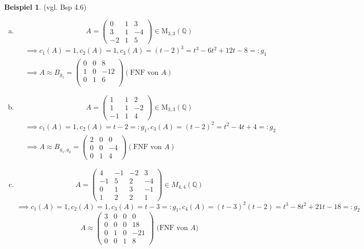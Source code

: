 \documentclass[a4paper, titlepage]{article}
\theoremstyle{definition}
\newtheorem{bsp}[satz]{Beispiel}
\newcommand{\Q}{\mathbb{Q}}
\newcommand{\M}{\mathrm{M}}
\begin{document}
\begin{bsp} (vgl. Bsp 4.6)
    \begin{enumerate}[(a)]
        \item $$A=\begin{pmatrix}
            0 & 1& 3\\
            3 & 1 & -4 \\
            -2 & 1 & 5
        \end{pmatrix}\in \M_{3,3}(\Q)$$
        \begin{align*}
            &\implies c_1(A)=1,c_2(A)=1,c_3(A)=(t-2)^3=t^3-6t^2+12t-8=:g_1\\
            &\implies A\approx B_{g_1}=\begin{pmatrix} 0& 0& 8\\
                1 & 0 & -12\\
                0 & 1 & 6\\
            \end{pmatrix} (\text{FNF von }A)
        \end{align*}
        \item $$A=\begin{pmatrix}
            1 & 1& 2\\
            1 & 1 & -2 \\
            -1 & 1 & 4
        \end{pmatrix}\in \M_{3,3}(\Q)$$
        \begin{align*}
            &\implies c_1(A)=1,c_2(A)=t-2=:g_1,c_3(A)=(t-2)^2=t^2-4t+4=:g_2\\
            &\implies A\approx B_{g_1,g_2}=\left(\begin{array}{c|cc}
                2 & 0& 0\\
                \hline 0 & 0& -4\\
                0 & 1 & 4
            \end{array}\right) (\text{FNF von }A)
        \end{align*}
        \item $$A=\begin{pmatrix}
            4 & -1 & -2 & 3 \\
            -1 & 5 & 2 & -4\\
            0 & 1 & 3 &-1\\
            1 & 2 & 2 & 1 
        \end{pmatrix} \in M_{4,4}(\Q)$$
$\implies c_1(A)=1,c_2(A)=1,c_3(A)=t-3=:g_1,c_4(A)=(t-3)^2(t-2)=t^3-8t^2+21t-18=:g_2$
$$A\approx \left(\begin{array}{c|ccc}
    3 &0 &0 &0\\
    \hline 0 & 0 & 0 & 18\\
    0 & 1 & 0 & -21\\
    0 & 0 & 1 & 8
\end{array}\right)\text{ (FNF von }A)$$
\end{enumerate}
\end{bsp}
\end{document}
